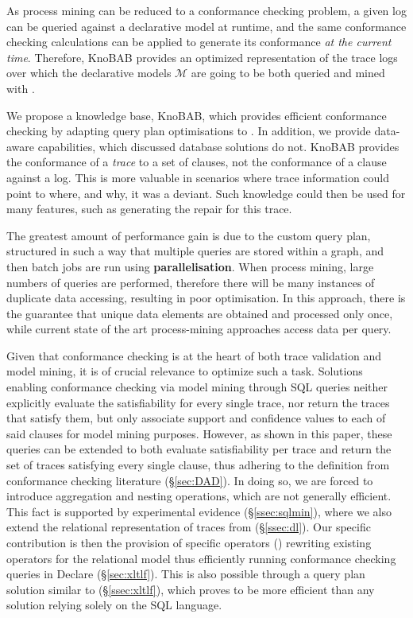 As process mining can be reduced to a conformance checking problem, a given log can be queried against a declarative model at runtime, and the same conformance checking calculations can be applied to generate its conformance \emph{at the current time}. Therefore, KnoBAB provides an optimized representation of the trace logs over which the declarative models $\mathcal{M}$ are going to be both queried and mined with \LTLf.

We propose a knowledge base, KnoBAB, which provides efficient conformance checking by adapting query plan optimisations \cite{BellatrecheKB21} to \LTLf. In addition, we provide data-aware capabilities, which discussed database solutions do not. KnoBAB provides the conformance of a \emph{trace} to a set of clauses, not the conformance of a clause against a log. This is more valuable in scenarios where trace information could point to where, and why, it was a deviant. Such knowledge could then be used for many features, such as generating the repair for this trace.
\medskip


The greatest amount of performance gain is due to the custom query plan, structured in such a way that multiple queries are stored within a graph, and then batch jobs are run using \textbf{parallelisation}. When process mining, large numbers of queries are performed, therefore there will be many instances of duplicate data accessing, resulting in poor optimisation. In this approach, there is the guarantee that unique data elements are obtained and processed only once, while current state of the art process-mining approaches access data per query. 
\fi


Given that conformance checking is at the heart of both trace validation and model mining, it is of crucial relevance to optimize such a task.
Solutions enabling conformance checking via model mining through SQL queries \cite{Schonig15,SchonigRCJM16}  neither explicitly evaluate the satisfiability for every single trace, nor return the traces that satisfy them, but only associate support and confidence values to each of said clauses for model mining purposes. However, as shown in this paper,  these queries can be extended to both 
evaluate satisfiability per trace and return the set of traces satisfying every single clause, thus adhering to the definition from conformance checking literature (\S\ref{sec:DAD}). In doing so,  we are forced to introduce  aggregation and nesting operations, which are not generally efficient. This fact is supported by experimental evidence (\S\ref{ssec:sqlmin}), where we also extend the relational representation of traces from \cite{Schonig15,SchonigRCJM16} (\S\ref{ssec:dl}). Our specific contribution is then the provision of specific operators (\xLTLf) rewriting existing \LTLf operators for the relational  model thus efficiently running conformance checking queries in Declare (\S\ref{sec:xltlf}). This is also possible through a query plan solution similar to  \cite{BellatrecheKB21} (\S\ref{ssec:xltlf}), which  proves to be more efficient than any solution relying solely on the SQL language.

